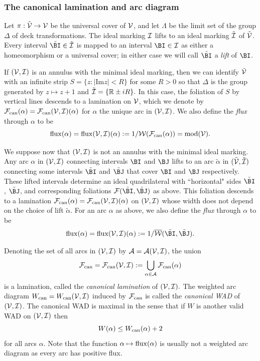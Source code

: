 \documentclass[12pt]{amsart}
\begin{document}
\subsubsection{The canonical lamination and arc diagram}\label{app:wcan}

Let $\pi: \tilde {\mathcal V}\to \mathcal V$ be the universal cover of $\mathcal V$, and let $\Lambda$ be the limit set of the group $\Delta$ of deck transformations. 
The ideal marking $\mathcal I$ lifts to an ideal marking $\tilde {\mathcal I}$ of $\tilde {\mathcal V}$. Every interval $\tilde \BI\in \tilde \II$ is mapped to an interval $\BI\in \II$ as either a homeomorphism or a universal cover; in either case we will call $\tilde \BI$ a \textit{lift} of $\BI$. 

If $(\mathcal V, \mathcal I)$ is an annulus with the minimal ideal marking, then we can identify $\tilde {\mathcal V}$ with an infinite strip $S= \{z: |\text{Im}z|< R\}$ for some $R>0$ so that $\Delta$ is the group generated by $z\mapsto z+1$ and $\tilde {\mathcal I} = \{\mathbb R\pm iR\}.$
In this case, 
the foliation of $S$ by vertical lines descends to a lamination on $\mathcal V$, 
which we 
denote by $\mathcal F_{\operatorname{can}}(\alpha) = \mathcal F_{\operatorname{can}}(\mathcal V, \mathcal I)(\alpha)$ for $\alpha$ the unique arc in $(\mathcal V, \mathcal I)$.  We also define the \textit{flux} through $\alpha$ to be 
$$\operatorname{flux}(\alpha)= \operatorname{flux}(\mathcal V, \mathcal I)(\alpha):= 1/\mathcal W(\mathcal F_{\operatorname{can}}(\alpha))= \operatorname{mod}(\mathcal V).$$

We suppose now that $(\mathcal V, \mathcal I)$ is not an annulus with the minimal ideal marking. 
Any arc $\alpha$ in $(\mathcal V, \mathcal I)$ connecting intervals $\BI$ and $\BJ$ lifts to an arc $\tilde \alpha$ in $(\tilde{\mathcal V}, \tilde {\mathcal I})$ connecting some intervals $\tilde \BI$ and $\tilde \BJ$ that cover $\BI$ and $\BJ$ respectively. These lifted intervals determine an ideal quadrilateral with ``horizontal" sides $\tilde\BI$, $\tilde\BJ$, and corresponding foliations $\FF(\tilde \BI, \tilde \BJ)$ as above. 
This foliation descends to a lamination $\mathcal F_{\operatorname{can}}(\alpha) = \mathcal F_{\operatorname{can}}(\mathcal V, \mathcal I) (\alpha)$ on $(\mathcal V, \mathcal I)$ whose width does not depend on the choice of lift $\tilde \alpha$. 
For an arc $\alpha$ as above, we also define the \textit{flux} through $\alpha$ to be
$$\flux(\alpha)= \flux(\VV, \II)(\alpha):= 1/{\overline{\WW}(\tilde \BI, \tilde\BJ)}.$$



Denoting the set of all arcs in $(\mathcal V, \mathcal I)$ by $\mathcal A = \mathcal A(\mathcal V, \mathcal I)$, the union $$\mathcal F_{\operatorname{can}} = \mathcal F_{\operatorname{can}}(\mathcal V, \mathcal I):=\bigcup_{\alpha\in \mathcal A}\mathcal F_{\operatorname{can}}(\alpha)$$
is a lamination, called the \textit{canonical lamination} of $(\mathcal V, \mathcal I).$
 The weighted arc diagram 
$W_{\operatorname{can}} = W_{\operatorname{can}}(\mathcal V, \mathcal I)$ induced by $\mathcal F_{\operatorname{can}}$ is called the \textit{canonical WAD}  of $(\mathcal V, \mathcal I)$. 
The canonical WAD is maximal in the sense that if $W$ is another valid WAD on $(\mathcal V, \mathcal I)$ then 
$$W(\alpha)\leq W_{\operatorname{can}}(\alpha)+2$$
for all arcs $\alpha$. Note that the function $\alpha\mapsto \operatorname{flux}(\alpha)$ is  usually not a weighted arc diagram as every arc has positive flux.
\end{document}
